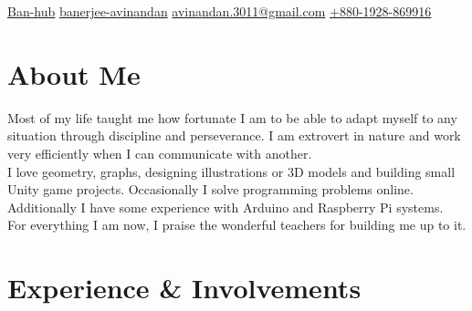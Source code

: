 \documentclass[]{plushcv}
\begin{document}
%
%

{\contactline
{\href{https://www.github.com/Ban-hub}{Ban-hub}}
{\href{https://www.linkedin.com/in/banerjee-avinandan}{banerjee-avinandan}}
{\href{mailto:avinandan.3011@gmail.com}{avinandan.3011@gmail.com}}
{\href{tel:+880-1928-869916}{+880-1928-869916}}
}

%
%

\begin{minipage}[t]{0.63\textwidth} 



\section{About Me}
{\justifying \noindent
Most of my life taught me how fortunate I am to be able to adapt myself to any situation through discipline and perseverance. I am extrovert in nature and work very efficiently when I can communicate with another.\\
I love geometry, graphs, designing illustrations or 3D models and building small Unity game projects. Occasionally I solve programming problems online. Additionally I have some experience with Arduino and Raspberry Pi systems. \\
For everything I am now, I praise the wonderful teachers for building me up to it.}
\sectionsep



\section{Experience \& Involvements}

\sectionsep
{}


\end{minipage}
\end{document}

